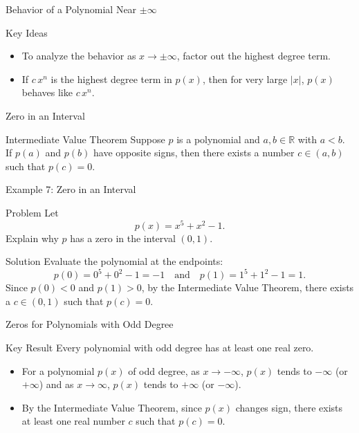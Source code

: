 \documentclass{beamer}
\begin{document}
\begin{frame}{Behavior of a Polynomial Near \(\pm\infty\)}
  \begin{block}{Key Ideas}
    \begin{itemize}
      \item To analyze the behavior as \(x\to\pm\infty\), factor out the highest degree term.
      \item If \(c\,x^n\) is the highest degree term in \(p(x)\), then for very large \(|x|\), \(p(x)\) behaves like \(c\,x^n\).
    \end{itemize}
  \end{block}
\end{frame}
   

\begin{frame}{Zero in an Interval}
  \begin{block}{Intermediate Value Theorem}
    Suppose \(p\) is a polynomial and \(a, b \in \mathbb{R}\) with \(a < b\). If \(p(a)\) and \(p(b)\) have opposite signs, then there exists a number \(c \in (a, b)\) such that \(p(c)=0\).
  \end{block}
\end{frame}


\begin{frame}{Example 7: Zero in an Interval}
  \begin{exampleblock}{Problem}
    Let 
    \[
      p(x) = x^5 + x^2 - 1.
    \]
    Explain why \(p\) has a zero in the interval \((0,1)\).
  \end{exampleblock}
  
  \begin{block}{Solution}
    Evaluate the polynomial at the endpoints:
    \[
      p(0) = 0^5 + 0^2 - 1 = -1 \quad \text{and} \quad p(1) = 1^5 + 1^2 - 1 = 1.
    \]
    Since \(p(0) < 0\) and \(p(1) > 0\), by the Intermediate Value Theorem, there exists a \(c \in (0,1)\) such that \(p(c)=0\).
  \end{block}
\end{frame}

\begin{frame}{Zeros for Polynomials with Odd Degree}
  \begin{block}{Key Result}
    Every polynomial with odd degree has at least one real zero.
  \end{block}
  \vspace{0.5em}
  \begin{itemize}
    \item For a polynomial \(p(x)\) of odd degree, as \(x \to -\infty\), \(p(x)\) tends to \(-\infty\) (or \(+\infty\)) and as \(x \to \infty\), \(p(x)\) tends to \(+\infty\) (or \(-\infty\)).
    \item By the Intermediate Value Theorem, since \(p(x)\) changes sign, there exists at least one real number \(c\) such that \(p(c)=0\).
  \end{itemize}
\end{frame}
\end{document}
